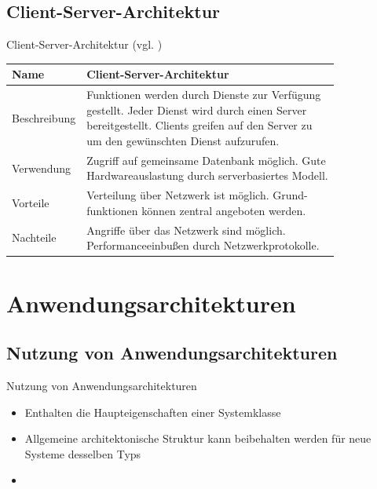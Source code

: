 \documentclass{beamer}
\begin{document}
			\subsection{Client-Server-Architektur}
			\begin{frame}{Client-Server-Architektur (vgl. \cite[ S. 198]{sommer})}
			\begin{tabular}{*{2}{l}}
				\toprule
				\textbf{Name}&\textbf{Client-Server-Architektur}\\
				\midrule\midrule
				Beschreibung&\makecell[l]{Funktionen werden durch Dienste zur Verfügung\\ gestellt. Jeder Dienst wird durch einen Server\\ bereitgestellt. Clients greifen auf den Server zu\\ um den gewünschten Dienst aufzurufen.}\\\midrule
				Verwendung&\makecell[l]{Zugriff auf gemeinsame Datenbank möglich. Gute\\ Hardwareauslastung durch serverbasiertes Modell.}\\\midrule
				Vorteile&\makecell[l]{Verteilung über Netzwerk ist möglich. Grund-\\funktionen können zentral angeboten werden.}\\\midrule
				Nachteile&\makecell[l]{Angriffe über das Netzwerk sind möglich.\\ Performanceeinbußen durch Netzwerkprotokolle.}\\
				\bottomrule
			\end{tabular}
			\end{frame}	
	\section{Anwendungsarchitekturen}
		\subsection{Nutzung von Anwendungsarchitekturen}
			\begin{frame}{Nutzung von Anwendungsarchitekturen}
				\begin{itemize} %
					\item Enthalten die Haupteigenschaften einer Systemklasse
					\item Allgemeine architektonische Struktur kann beibehalten werden für neue Systeme desselben Typs
					\item
				\end{itemize}
			\end{frame}
\end{document}
